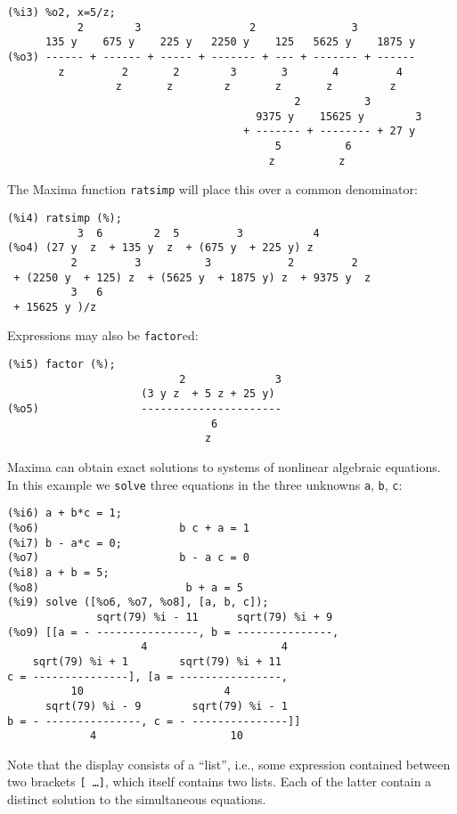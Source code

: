 \documentclass[a4paper,12pt]{article}
\begin{document}
\noindent\begin{minipage}{\textwidth}
\begin{verbatim}
(%i3) %o2, x=5/z;
           2        3                 2               3
      135 y    675 y    225 y   2250 y    125   5625 y    1875 y
(%o3) ------ + ------ + ----- + ------- + --- + ------- + ------
        z         2       2        3       3       4         4
                 z       z        z       z       z         z
                                             2          3
                                       9375 y    15625 y        3
                                     + ------- + -------- + 27 y
                                          5          6
                                         z          z
\end{verbatim}
\end{minipage}
The Maxima function {\tt ratsimp} will place this over a common denominator:
\begin{verbatim}
(%i4) ratsimp (%);
           3  6        2  5         3           4
(%o4) (27 y  z  + 135 y  z  + (675 y  + 225 y) z
          2         3          3            2         2
 + (2250 y  + 125) z  + (5625 y  + 1875 y) z  + 9375 y  z
          3   6
 + 15625 y )/z
\end{verbatim}
Expressions may also be {\tt factor}ed:
\begin{verbatim}
(%i5) factor (%);
                           2              3
                     (3 y z  + 5 z + 25 y)
(%o5)                ----------------------
                                6
                               z
\end{verbatim}
Maxima can obtain exact solutions to systems of nonlinear algebraic
equations.  In this example we {\tt solve} three equations in the
three unknowns {\tt a}, {\tt b}, {\tt c}:
\begin{verbatim}
(%i6) a + b*c = 1;
(%o6)                      b c + a = 1
(%i7) b - a*c = 0;
(%o7)                      b - a c = 0
(%i8) a + b = 5;
(%o8)                       b + a = 5
(%i9) solve ([%o6, %o7, %o8], [a, b, c]);
              sqrt(79) %i - 11      sqrt(79) %i + 9
(%o9) [[a = - ----------------, b = ---------------,
                     4                     4
    sqrt(79) %i + 1        sqrt(79) %i + 11
c = ---------------], [a = ----------------,
          10                      4
      sqrt(79) %i - 9        sqrt(79) %i - 1
b = - ---------------, c = - ---------------]]
             4                     10
\end{verbatim}
Note that the display consists of a ``list'', i.e., some expression
contained between two brackets {\tt [ \ldots ]}, which itself contains
two lists.  Each of the latter contain a distinct solution to the
simultaneous equations.
\end{document}
